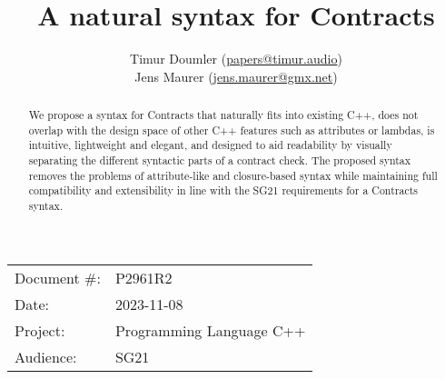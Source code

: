 



\usepackage{titlesec}
\usepackage{tocloft}


\newcommand{\changelocaltocdepth}[1]{%
  \addtocontents{toc}{\protect\setcounter{tocdepth}{#1}}%
  \setcounter{tocdepth}{#1}%
}

\setcounter{tocdepth}{3}



\title{A natural syntax for Contracts}
\author{ Timur Doumler \small(\href{mailto:papers@timur.audio}{papers@timur.audio})\\
Jens Maurer \small(\href{mailto:jens.maurer@gmx.net}{jens.maurer@gmx.net})}
\date{}
\maketitle

\begin{tabular}{ll}
Document \#: & P2961R2 \\
Date: &2023-11-08\\
Project: & Programming Language C++ \\
Audience: & SG21
\end{tabular}

\begin{abstract}
We propose a syntax for Contracts that naturally fits into existing C++, does not overlap with the design space of other C++ features such as attributes or lambdas, is intuitive, lightweight and elegant, and designed to aid readability by visually separating the different syntactic parts of a contract check. The proposed syntax removes the problems of attribute-like and closure-based syntax while maintaining full compatibility and extensibility in line with the SG21 requirements for a Contracts syntax.
\end{abstract}


\tableofcontents*


